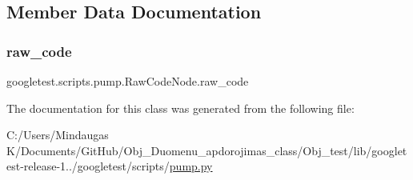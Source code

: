 \subsection{Member Data Documentation}
\mbox{\label{classgoogletest_1_1scripts_1_1pump_1_1_raw_code_node_a5859d5c13d0fa1b3efd41ef4faec8704}} 
\subsubsection{\texorpdfstring{raw\_code}{raw\_code}}
{\footnotesize\ttfamily googletest.\+scripts.\+pump.\+Raw\+Code\+Node.\+raw\+\_\+code}



The documentation for this class was generated from the following file\+:\begin{DoxyCompactItemize}
\item 
C\+:/\+Users/\+Mindaugas K/\+Documents/\+Git\+Hub/\+Obj\+\_\+\+Duomenu\+\_\+apdorojimas\+\_\+class/\+Obj\+\_\+test/lib/googletest-\/release-\/1../googletest/scripts/\mbox{\hyperlink{_obj__test_2lib_2googletest-release-1_88_81_2googletest_2scripts_2pump_8py}{pump.\+py}}\end{DoxyCompactItemize}
